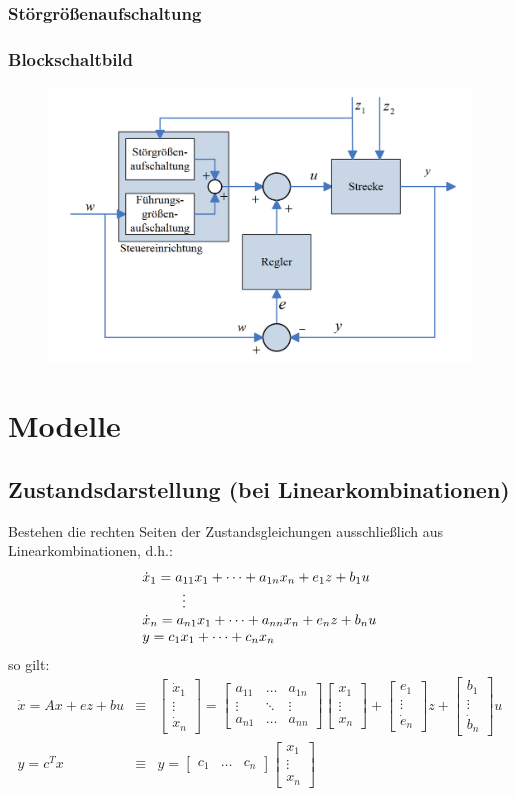 \documentclass[10pt,a4paper]{article}
\newcommand{\tab}[1][1]{\hspace*{#1cm}}
\newcommand{\vect}[1]{\ensuremath{\begin{bmatrix}#1\end{bmatrix}}}
\begin{document}
\subsubsection{Störgrößenaufschaltung}
\subsubsection*{Blockschaltbild}
\begin{figure}[H]
	\includegraphics[width=0.6\columnwidth]{imgs/abb1_11.png}
\end{figure}

\section{Modelle}
\subsection{Zustandsdarstellung (bei Linearkombinationen)}
Bestehen die rechten Seiten der Zustandsgleichungen ausschließlich aus Linearkombinationen, d.h.:
$$
\begin{array}{l}
	\dot x_1 = a_{11} x_1 + \dots + a_{1n} x_n + e_1 z + b_1 u \\
	\tab \vdots \\
	\dot x_n = a_{n1} x_1 + \dots + a_{nn} x_n + e_n z + b_n u \\
	y = c_1 x_1 + \dots + c_n x_n
\end{array}	
$$
so gilt:
$$
\begin{array}{lcl}
	\dot{x} = A x + e z + b u & ≡ & \vect{\dot x_1 \\ \vdots \\ \dot x_n} = \vect{a_{11} & \dots & a_{1n} \\ \vdots & \ddots & \vdots \\ a_{n1} & \dots & a_{nn}} \vect{x_1 \\ \vdots \\ x_n} + \vect{e_1 \\ \vdots \\ \dot e_n} z + \vect{b_1 \\ \vdots \\ \dot b_n} u \\
	y = c^Tx & ≡ & y = \vect{c_1 & \dots & c_n} \vect{x_1 \\ \vdots \\ x_n}
\end{array}
$$
\end{document}
